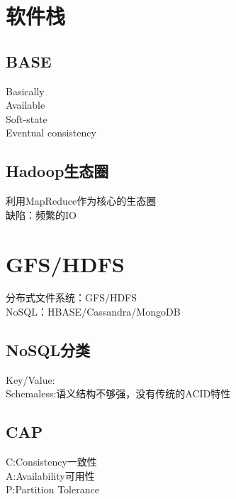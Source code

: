 \documentclass{article}
\begin{document}
\begin{CJK}{UTF8}{gbsn}
	\section*{软件栈}
	
	
	\subsection*{BASE}
	Basically\\
	Available\\
	Soft-state\\
	Eventual consistency\\
	
	\subsection*{Hadoop生态圈}
	利用MapReduce作为核心的生态圈\\
	缺陷：频繁的IO\\
	
	
	\section*{GFS/HDFS}
	分布式文件系统：GFS/HDFS\\
	NoSQL：HBASE/Cassandra/MongoDB\\
	\subsection*{NoSQL分类}
	Key/Value:\\
	Schemaless:语义结构不够强，没有传统的ACID特性\\
	
	\subsection*{CAP}
	C:Consistency一致性\\
	A:Availability可用性\\
	P:Partition Tolerance\\

\end{CJK}
\end{document}
